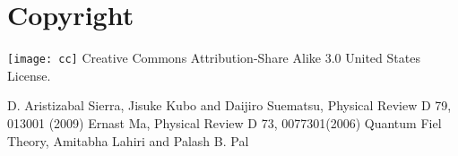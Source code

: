 \section{Copyright}
\texttt{[image: cc]} Creative Commons Attribution-Share Alike 3.0 United States License.

\begin{thebibliography}{9}

 D. Aristizabal Sierra, Jisuke Kubo and Daijiro Suematsu, Physical Review D 79, 013001 (2009)
 Ernast Ma, Physical Review D 73, 0077301(2006)
 Quantum Fiel Theory, Amitabha Lahiri and Palash B. Pal

\end{thebibliography}

